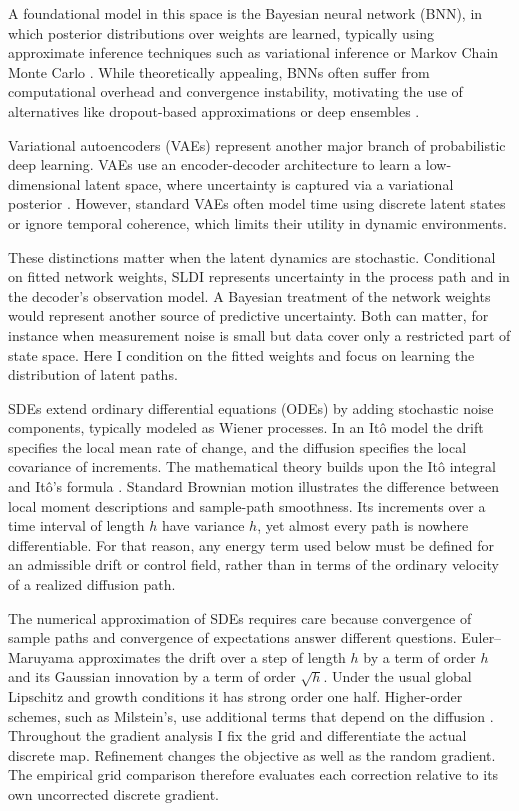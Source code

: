 \documentclass[12pt]{article}
\begin{document}
A foundational model in this space is the Bayesian neural network (BNN), in which posterior distributions over weights are learned, typically using approximate inference techniques such as variational inference or Markov Chain Monte Carlo \citep{neal2012bayesian}. While theoretically appealing, BNNs often suffer from computational overhead and convergence instability, motivating the use of alternatives like dropout-based approximations \citep{gal2016dropout} or deep ensembles \citep{lakshminarayanan2017simple}.

Variational autoencoders (VAEs) represent another major branch of probabilistic deep learning. VAEs use an encoder-decoder architecture to learn a low-dimensional latent space, where uncertainty is captured via a variational posterior \citep{kingma2013auto}. However, standard VAEs often model time using discrete latent states or ignore temporal coherence, which limits their utility in dynamic environments.

These distinctions matter when the latent dynamics are stochastic. Conditional on fitted network weights, SLDI represents uncertainty in the process path and in the decoder's observation model. A Bayesian treatment of the network weights would represent another source of predictive uncertainty. Both can matter, for instance when measurement noise is small but data cover only a restricted part of state space. Here I condition on the fitted weights and focus on learning the distribution of latent paths.

SDEs extend ordinary differential equations (ODEs) by adding stochastic noise components, typically modeled as Wiener processes. In an It\^o model the drift specifies the local mean rate of change, and the diffusion specifies the local covariance of increments. The mathematical theory builds upon the It\^o integral and It\^o's formula \citep{sarkka2019applied}. Standard Brownian motion illustrates the difference between local moment descriptions and sample-path smoothness. Its increments over a time interval of length \(h\) have variance \(h\), yet almost every path is nowhere differentiable. For that reason, any energy term used below must be defined for an admissible drift or control field, rather than in terms of the ordinary velocity of a realized diffusion path.

The numerical approximation of SDEs requires care because convergence of sample paths and convergence of expectations answer different questions. Euler--Maruyama approximates the drift over a step of length \(h\) by a term of order \(h\) and its Gaussian innovation by a term of order \(\sqrt h\). Under the usual global Lipschitz and growth conditions it has strong order one half. Higher-order schemes, such as Milstein's, use additional terms that depend on the diffusion \citep{kloeden1992numerical}. Throughout the gradient analysis I fix the grid and differentiate the actual discrete map. Refinement changes the objective as well as the random gradient. The empirical grid comparison therefore evaluates each correction relative to its own uncorrected discrete gradient.
\end{document}
